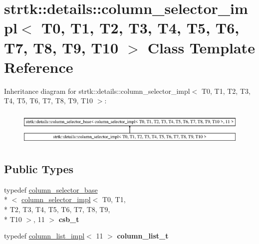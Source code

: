 \hypertarget{classstrtk_1_1details_1_1column__selector__impl_3_01T0_00_01T1_00_01T2_00_01T3_00_01T4_00_01T5_0c1c6bb8abfc5930b575d229537727fec}{\section{strtk\-:\-:details\-:\-:column\-\_\-selector\-\_\-impl$<$ T0, T1, T2, T3, T4, T5, T6, T7, T8, T9, T10 $>$ Class Template Reference}
\label{classstrtk_1_1details_1_1column__selector__impl_3_01T0_00_01T1_00_01T2_00_01T3_00_01T4_00_01T5_0c1c6bb8abfc5930b575d229537727fec}
}
Inheritance diagram for strtk\-:\-:details\-:\-:column\-\_\-selector\-\_\-impl$<$ T0, T1, T2, T3, T4, T5, T6, T7, T8, T9, T10 $>$\-:\begin{figure}[H]
\begin{center}
\leavevmode
\includegraphics[height=1.696970cm]{classstrtk_1_1details_1_1column__selector__impl_3_01T0_00_01T1_00_01T2_00_01T3_00_01T4_00_01T5_0c1c6bb8abfc5930b575d229537727fec}
\end{center}
\end{figure}
\subsection*{Public Types}
\begin{DoxyCompactItemize}
\item 
\hypertarget{classstrtk_1_1details_1_1column__selector__impl_3_01T0_00_01T1_00_01T2_00_01T3_00_01T4_00_01T5_0c1c6bb8abfc5930b575d229537727fec_adf496ec49826d8934570379581e134bc}{typedef \hyperlink{classstrtk_1_1details_1_1column__selector__base}{column\-\_\-selector\-\_\-base}\\*
$<$ \hyperlink{classstrtk_1_1details_1_1column__selector__impl}{column\-\_\-selector\-\_\-impl}$<$ T0, T1, \\*
T2, T3, T4, T5, T6, T7, T8, T9, \\*
T10 $>$, 11 $>$ {\bfseries csb\-\_\-t}}\label{classstrtk_1_1details_1_1column__selector__impl_3_01T0_00_01T1_00_01T2_00_01T3_00_01T4_00_01T5_0c1c6bb8abfc5930b575d229537727fec_adf496ec49826d8934570379581e134bc}

\item 
\hypertarget{classstrtk_1_1details_1_1column__selector__impl_3_01T0_00_01T1_00_01T2_00_01T3_00_01T4_00_01T5_0c1c6bb8abfc5930b575d229537727fec_af64aa1bceabcd372d3c06dba7d34d31c}{typedef \hyperlink{structstrtk_1_1details_1_1column__list__impl}{column\-\_\-list\-\_\-impl}$<$ 11 $>$ {\bfseries column\-\_\-list\-\_\-t}}\label{classstrtk_1_1details_1_1column__selector__impl_3_01T0_00_01T1_00_01T2_00_01T3_00_01T4_00_01T5_0c1c6bb8abfc5930b575d229537727fec_af64aa1bceabcd372d3c06dba7d34d31c}

\end{DoxyCompactItemize}
